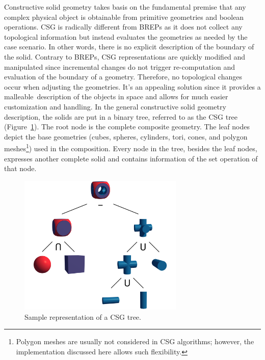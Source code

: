 \documentclass[a4paper,11pt,oneside]{article}
\begin{document}
Constructive solid geometry takes basis on the fundamental premise that any complex physical object is obtainable from primitive geometries and boolean operations. CSG is radically different from BREPs as it does not collect any topological information but instead evaluates the geometries as needed by the case scenario. In other words, there is no explicit description of the boundary of the solid. Contrary to BREPs,  CSG representations are quickly modified and manipulated since incremental changes do not trigger re-computation and evaluation of the boundary of a geometry. Therefore, no topological changes occur when adjusting the geometries. It's an appealing solution since it provides a malleable description of the objects in space and allows for much easier customization and handling. In the general constructive solid geometry description, the solids are put in a binary tree, referred to as the CSG tree (Figure~\ref{sec3.1:sample-csg-tree}). The root node is the complete composite geometry. The leaf nodes depict the base geometries (cubes, spheres, cylinders, tori, cones, and polygon meshes\footnote{Polygon meshes are usually not considered in CSG algorithms; however, the implementation discussed here allows such flexibility.}) used in the composition. Every node in the tree, besides the leaf nodes, expresses another complete solid and contains information of the set operation of that node.

\begin{figure}[ht]
	\begin{center}
		\includegraphics[width=0.7\textwidth]{section1/sample-csg-tree.png}
	\end{center}
	\caption{Sample representation of a CSG tree.}
	\label{sec3.1:sample-csg-tree}
\end{figure}
  
\end{document}

